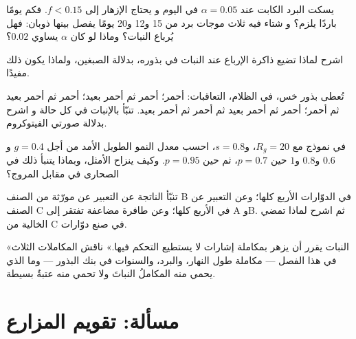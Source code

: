 \begin{exercise}[$\star\star$]\label{exo:b2:plant-flowering:7}
يسكت البرد الكابت عند $\alpha = 0.05$ في اليوم و
يحتاج الإزهار إلى $f < 0.15$. فكم يومًا باردًا يلزم؟ و
شتاء فيه ثلاث موجات برد من 15 و12 و20 يومًا يفصل بينها
ذوبان: فهل يُرباع النبات؟ وماذا لو كان $\alpha$ يساوي $0.02$؟
\end{exercise}

\begin{exercise}[$\star\star$]\label{exo:b2:plant-flowering:8}
اشرح لماذا تضيع ذاكرة الإرباع عند النبات في بذوره،
بدلالة الصبغين، ولماذا يكون ذلك مفيدًا.
\end{exercise}

\begin{exercise}[$\star\star$]\label{exo:b2:plant-flowering:9}
تُعطى بذور خس، في الظلام، التعاقبات: أحمر؛ أحمر ثم أحمر بعيد؛
أحمر ثم أحمر بعيد ثم أحمر؛ أحمر ثم أحمر بعيد ثم أحمر ثم أحمر بعيد. تنبّأ بالإنبات في كل حالة و
اشرح بدلالة صورتي الفيتوكروم.
\end{exercise}

\begin{exercise}[$\star\star\star$]\label{exo:b2:plant-flowering:10}
في نموذج  مع $R_g = 20$، و$s = 0.8$، احسب
معدل النمو الطويل الأمد من أجل $g = 0.4$ و$0.6$ و$0.8$ و$1$ حين
$p = 0.7$، ثم حين $p = 0.95$. وكيف ينزاح الأمثل،
وبماذا يتنبأ ذلك في الصحارى في مقابل المروج؟
\end{exercise}

\begin{exercise}[$\star\star\star$]\label{exo:b2:plant-flowering:11}
تنبّأ  الناتجة عن التعبير عن مورّثة من الصنف B في الدوّارات
الأربع كلها؛ وعن التعبير عن الصنف C في الأربع كلها؛ وعن طافرة مضاعفة
تفتقر إلى A وB. ثم اشرح لماذا تمضي  الخالية من C في صنع
دوّارات.
\end{exercise}

\begin{exercise}[$\star\star\star$]\label{exo:b2:plant-flowering:12}
«النبات يقرر أن يزهر بمكاملة إشارات لا يستطيع
التحكم فيها.» ناقش المكاملات الثلاث في هذا الفصل --- مكاملة
طول النهار، والبرد، والسنوات في بنك البذور --- وما الذي يحمي
منه المكاملُ النباتَ ولا تحمي منه عتبةٌ بسيطة.
\end{exercise}

\section{مسألة: تقويم المزارع}

